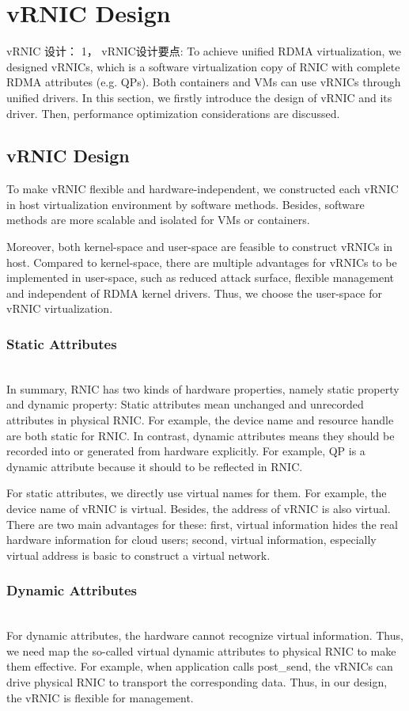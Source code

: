 \section{vRNIC Design}
vRNIC 设计：
1， vRNIC设计要点: 
To achieve unified RDMA virtualization, we designed vRNICs, which is a software virtualization copy of RNIC with complete RDMA attributes (e.g. QPs). Both containers and VMs can use vRNICs through unified drivers. In this section, we firstly introduce the design of vRNIC and its driver. Then, performance optimization considerations are discussed.

\subsection{vRNIC Design}
To make vRNIC flexible and hardware-independent, we constructed each vRNIC in host virtualization environment by software methods. Besides, software methods are more scalable and isolated for VMs or containers.

Moreover, both kernel-space and user-space are feasible to construct vRNICs in host. Compared to kernel-space, there are multiple advantages for vRNICs to be implemented in user-space, such as reduced attack surface, flexible management and independent of RDMA kernel drivers. Thus, we choose the user-space for vRNIC virtualization.

\subsubsection{Static Attributes} ~\\
In summary, RNIC has two kinds of hardware properties, namely static property and dynamic property: Static attributes mean unchanged and unrecorded attributes in physical RNIC. For example, the device name and resource handle are both static for RNIC. In contrast, dynamic attributes means they should be recorded into or generated from hardware explicitly. For example, QP is a dynamic attribute because it should to be reflected in RNIC.

For static attributes, we directly use virtual names for them. For example, the device name of vRNIC is virtual. Besides, the address of vRNIC is also virtual. There are two main advantages for these: first, virtual information hides the real hardware information for cloud users; second, virtual information, especially virtual address is basic to construct a virtual network. 
\subsubsection{Dynamic Attributes} ~\\
For dynamic attributes, the hardware cannot recognize virtual information. Thus, we need map the so-called virtual dynamic attributes to physical RNIC to make them effective. For example, when application calls post\_send, the vRNICs can drive physical RNIC to transport the corresponding data. Thus, in our design, the vRNIC is flexible for management. 

